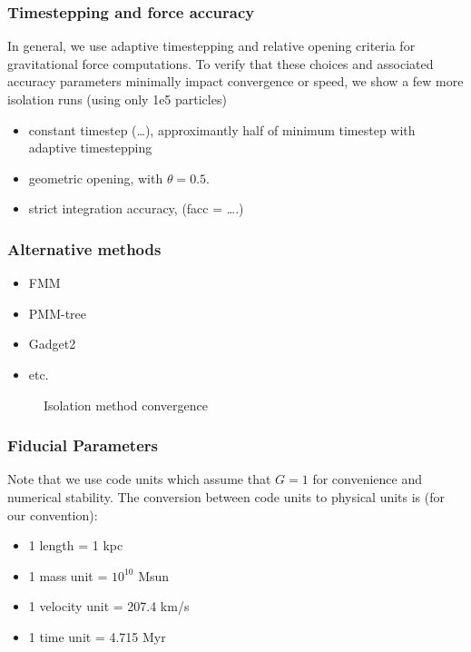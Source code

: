 \subsubsection{Timestepping and force
accuracy}\label{timestepping-and-force-accuracy}

In general, we use adaptive timestepping and relative opening criteria
for gravitational force computations. To verify that these choices and
associated accuracy parameters minimally impact convergence or speed, we
show a few more isolation runs (using only 1e5 particles)

\begin{itemize}
\tightlist
\item
  constant timestep (\ldots), approximantly half of minimum timestep
  with adaptive timestepping
\item
  geometric opening, with \(\theta = 0.5\).
\item
  strict integration accuracy, (facc = \ldots.)
\end{itemize}

\subsubsection{Alternative methods}\label{alternative-methods}

\begin{itemize}
\tightlist
\item
  FMM
\item
  PMM-tree
\item
  Gadget2
\item
  etc.
\end{itemize}

\begin{figure}
\centering
{}
\caption{Isolation method convergence}\label{fig:methods_convergence}
\end{figure}

\subsubsection{Fiducial Parameters}\label{fiducial-parameters}

Note that we use code units which assume that \(G=1\) for convenience
and numerical stability. The conversion between code units to physical
units is (for our convention):

\begin{itemize}
\tightlist
\item
  1 length = 1 kpc
\item
  1 mass unit = \(10^{10}\) Msun
\item
  1 velocity unit = 207.4 km/s
\item
  1 time unit = 4.715 Myr
\end{itemize}

